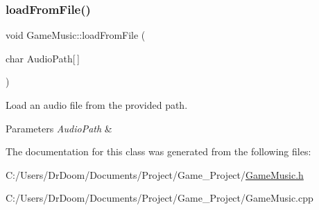 \subsubsection{\texorpdfstring{load\+From\+File()}{loadFromFile()}}
{\footnotesize\ttfamily void Game\+Music\+::load\+From\+File (\begin{DoxyParamCaption}\item[{char}]{Audio\+Path\mbox{[}$\,$\mbox{]} }\end{DoxyParamCaption})}



Load an audio file from the provided path. 


\begin{DoxyParams}{Parameters}
{\em Audio\+Path} & \\
\hline
\end{DoxyParams}


The documentation for this class was generated from the following files\+:\begin{DoxyCompactItemize}
\item 
C\+:/\+Users/\+Dr\+Doom/\+Documents/\+Project/\+Game\+\_\+\+Project/\hyperlink{_game_music_8h}{Game\+Music.\+h}\item 
C\+:/\+Users/\+Dr\+Doom/\+Documents/\+Project/\+Game\+\_\+\+Project/Game\+Music.\+cpp\end{DoxyCompactItemize}
